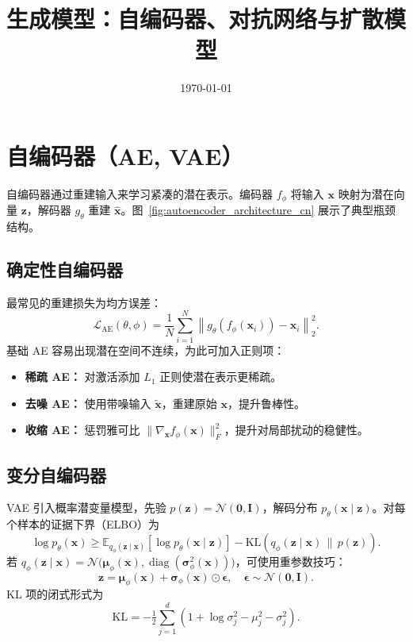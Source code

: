 \documentclass[UTF8,zihao=-4]{ctexart}
\title{生成模型：自编码器、对抗网络与扩散模型}
\author{}
\date{\today}
\begin{document}
\maketitle
\tableofcontents
\FloatBarrier

\section{自编码器（AE, VAE）}
自编码器通过重建输入来学习紧凑的潜在表示。编码器 $f_\phi$ 将输入 $\mathbf{x}$ 映射为潜在向量 $\mathbf{z}$，解码器 $g_\theta$ 重建 $\hat{\mathbf{x}}$。图~\ref{fig:autoencoder_architecture_cn} 展示了典型瓶颈结构。

\subsection{确定性自编码器}
最常见的重建损失为均方误差：
\begin{equation}
  \mathcal{L}_{\mathrm{AE}}(\theta, \phi) = \frac{1}{N} \sum_{i=1}^{N} \left\| g_\theta(f_\phi(\mathbf{x}_i)) - \mathbf{x}_i \right\|_2^2.
\end{equation}
基础 AE 容易出现潜在空间不连续，为此可加入正则项：
\begin{itemize}
  \item \textbf{稀疏 AE：} 对激活添加 $L_1$ 正则使潜在表示更稀疏。
  \item \textbf{去噪 AE：} 使用带噪输入 $\tilde{\mathbf{x}}$，重建原始 $\mathbf{x}$，提升鲁棒性。
  \item \textbf{收缩 AE：} 惩罚雅可比 $\|\nabla_{\mathbf{x}} f_\phi(\mathbf{x})\|_F^2$，提升对局部扰动的稳健性。
\end{itemize}

\subsection{变分自编码器}
VAE 引入概率潜变量模型，先验 $p(\mathbf{z}) = \mathcal{N}(\mathbf{0}, \mathbf{I})$，解码分布 $p_\theta(\mathbf{x} \mid \mathbf{z})$。对每个样本的证据下界（ELBO）为
\begin{equation}
  \log p_\theta(\mathbf{x}) \ge \mathbb{E}_{q_\phi(\mathbf{z} \mid \mathbf{x})}[\log p_\theta(\mathbf{x} \mid \mathbf{z})] - \mathrm{KL}(q_\phi(\mathbf{z} \mid \mathbf{x}) \,\|\, p(\mathbf{z})).
\end{equation}
若 $q_\phi(\mathbf{z} \mid \mathbf{x}) = \mathcal{N}\bigl(\boldsymbol{\mu}_\phi(\mathbf{x}), \operatorname{diag}(\boldsymbol{\sigma}^2_\phi(\mathbf{x}))\bigr)$，可使用重参数技巧：
\begin{equation}
  \mathbf{z} = \boldsymbol{\mu}_\phi(\mathbf{x}) + \boldsymbol{\sigma}_\phi(\mathbf{x}) \odot \boldsymbol{\epsilon}, \quad \boldsymbol{\epsilon} \sim \mathcal{N}(\mathbf{0}, \mathbf{I}).
\end{equation}
KL 项的闭式形式为
\begin{equation}
  \mathrm{KL} = -\tfrac{1}{2} \sum_{j=1}^{d} \left(1 + \log \sigma_j^2 - \mu_j^2 - \sigma_j^2 \right).
\end{equation}
\end{document}
